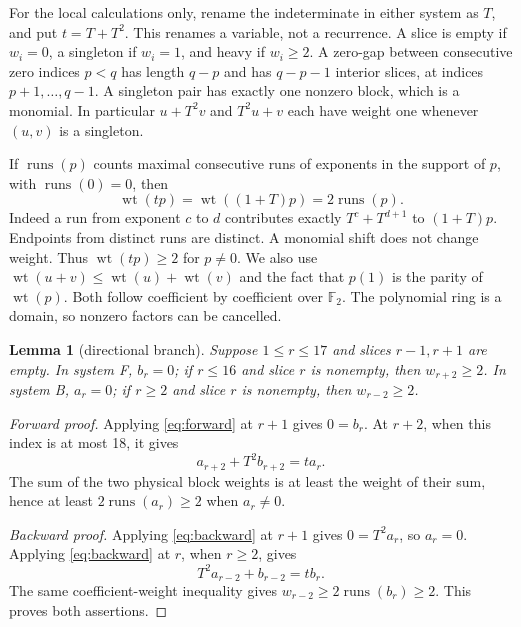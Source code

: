 \documentclass{article}
\newtheorem{lemma}{Lemma}
\DeclareMathOperator{\wt}{wt}
\DeclareMathOperator{\runs}{runs}
\newcommand{\Ftwo}{\mathbb{F}_2}
\begin{document}
For the local calculations only, rename the indeterminate in either system as \(T\), and put
\(t = T + T^2\). This renames a variable, not a recurrence. A slice is empty if \(w_i = 0\), a
singleton if \(w_i = 1\), and heavy if \(w_i \ge 2\). A zero-gap between consecutive zero indices
\(p < q\) has length \(q - p\) and has \(q - p - 1\) interior slices, at indices
\(p + 1, \dots, q - 1\). A singleton pair has exactly one nonzero block, which is a monomial. In
particular \(u + T^2 v\) and \(T^2 u + v\) each have weight one whenever \((u,v)\) is a
singleton.

If \(\runs(p)\) counts maximal consecutive runs of exponents in the support of \(p\), with
\(\runs(0) = 0\), then
\begin{equation}\label{eq:runs}
  \wt(tp) = \wt((1 + T)p) = 2\runs(p).
\end{equation}
Indeed a run from exponent \(c\) to \(d\) contributes exactly \(T^c + T^{d+1}\) to \((1 + T)p\).
Endpoints from distinct runs are distinct. A monomial shift does not change weight. Thus
\(\wt(tp) \ge 2\) for \(p \ne 0\). We also use \(\wt(u + v) \le \wt(u) + \wt(v)\) and the fact
that \(p(1)\) is the parity of \(\wt(p)\). Both follow coefficient by coefficient over \(\Ftwo\).
The polynomial ring is a domain, so nonzero factors can be cancelled.

\begin{lemma}[directional branch]\label{lem:branch}
  Suppose \(1 \le r \le 17\) and slices \(r - 1, r + 1\) are empty. In system F, \(b_r = 0\); if
  \(r \le 16\) and slice \(r\) is nonempty, then \(w_{r+2} \ge 2\). In system B, \(a_r = 0\); if
  \(r \ge 2\) and slice \(r\) is nonempty, then \(w_{r-2} \ge 2\).
\end{lemma}

\begin{proof}[Forward proof]
  Applying \eqref{eq:forward} at \(r + 1\) gives \(0 = b_r\). At \(r + 2\), when this index is
  at most 18, it gives
  \begin{equation}
    a_{r+2} + T^2 b_{r+2} = t a_r.
  \end{equation}
  The sum of the two physical block weights is at least the weight of their sum, hence at least
  \(2\runs(a_r) \ge 2\) when \(a_r \ne 0\).

  \emph{Backward proof.} Applying \eqref{eq:backward} at \(r + 1\) gives \(0 = T^2 a_r\), so
  \(a_r = 0\). Applying \eqref{eq:backward} at \(r\), when \(r \ge 2\), gives
  \begin{equation}
    T^2 a_{r-2} + b_{r-2} = t b_r.
  \end{equation}
  The same coefficient-weight inequality gives \(w_{r-2} \ge 2\runs(b_r) \ge 2\). This proves
  both assertions.
\end{proof}
\end{document}
